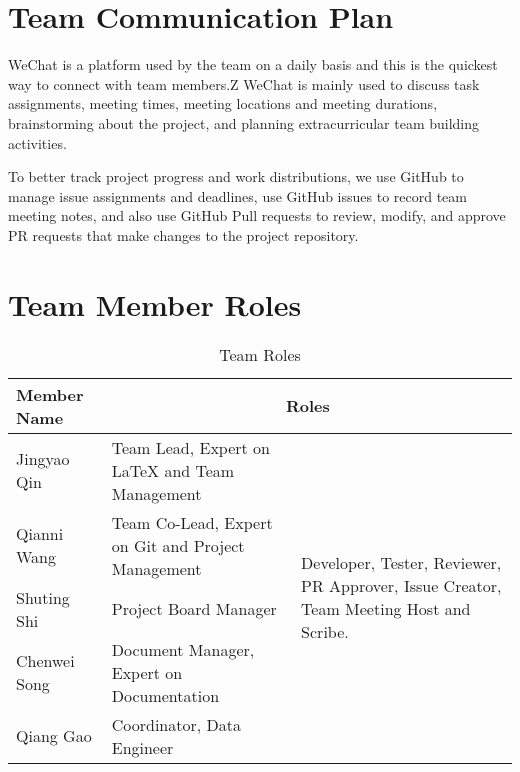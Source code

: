 \documentclass{article}
\begin{document}
\section{Team Communication Plan}
WeChat is a platform used by the team on a daily basis and this is the quickest way to connect with team members.Z WeChat is mainly used to discuss task assignments, meeting times, meeting locations and meeting durations, brainstorming about the project, and planning extracurricular team building activities. 

To better track project progress and work distributions, we use GitHub to manage issue assignments and deadlines, use GitHub issues to record team meeting notes, and also use GitHub Pull requests to review, modify, and approve PR requests that make changes to the project repository.

\section{Team Member Roles}

\begin{table}[ht]
  \centering
  \begin{tabular}{|p{3cm}|p{6cm}|p{3cm}|}
    \hline
    \textbf{Member Name} & \multicolumn{2}{c|}{\textbf{Roles}} \\
    \hline
    Jingyao Qin & Team Lead, Expert on LaTeX and Team Management & \multirow{5}{*}{\parbox{3cm}{Developer, Tester, Reviewer, PR Approver, Issue Creator, Team Meeting Host and Scribe.}}\\
    \cline{1-2} 
    Qianni Wang & Team Co-Lead, Expert on Git and Project Management & \\
    \cline{1-2} 
    Shuting Shi & Project Board Manager & \\
    \cline{1-2}
    Chenwei Song & Document Manager, Expert on Documentation & \\
    \cline{1-2} 
    Qiang Gao & Coordinator, Data Engineer & \\
    \hline
  \end{tabular}
  \caption{Team Roles}
\end{table}
\end{document}
